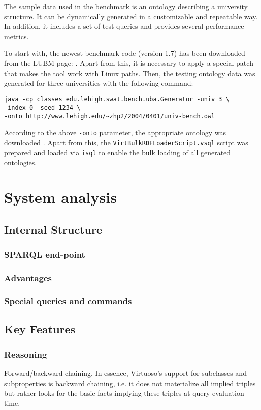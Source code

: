 The sample data used in the benchmark is an ontology describing a university
structure. It can be dynamically generated in a customizable and repeatable
way. In addition, it includes a set of test queries and provides several
performance metrics.

To start with, the newest benchmark code (version 1.7) has been downloaded from
the LUBM page: \cite{LUBMUrl}. Apart from this, it is necessary to apply a
special patch that makes the tool work with Linux paths. Then, the
testing ontology data was generated for three universities with the following
command:

\begin{verbatim}
java -cp classes edu.lehigh.swat.bench.uba.Generator -univ 3 \
-index 0 -seed 1234 \
-onto http://www.lehigh.edu/~zhp2/2004/0401/univ-bench.owl
\end{verbatim}

According to the above \texttt{-onto} parameter, the appropriate ontology was
downloaded \cite{LUBMUrlOWL}. Apart from this, the
\texttt{VirtBulkRDFLoaderScript.vsql} script was prepared and loaded via
\texttt{isql} to enable the bulk loading of all generated ontologies.

\chapter{System analysis}
\section{Internal Structure}
\subsection{SPARQL end-point}
\subsection{Advantages}
\subsection{Special queries and commands}

\section{Key Features}
\subsection{Reasoning}
Forward/backward chaining.
In essence, Virtuoso's support for subclasses and subproperties is backward
chaining, i.e. it does not materialize all implied triples but rather looks for
the basic facts implying these triples at query evaluation time.

